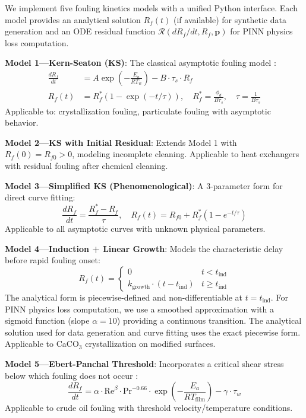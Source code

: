\documentclass[review]{elsarticle}
\begin{document}
We implement five fouling kinetics models with a unified Python interface. Each model provides an analytical solution $R_f(t)$ (if available) for synthetic data generation and an ODE residual function $\mathcal{R}(dR_f/dt, R_f, \mathbf{p})$ for PINN physics loss computation.

\textbf{Model 1---Kern-Seaton (KS)}: The classical asymptotic fouling model \cite{kern1959theoretical}:
\begin{align}
\frac{dR_f}{dt} &= A \exp\left(-\frac{E_a}{RT_w}\right) - B \cdot \tau_s \cdot R_f \\
R_f(t) &= R_f^*\left(1 - \exp(-t/\tau)\right), \quad R_f^* = \frac{\phi_d}{B\tau_s}, \quad \tau = \frac{1}{B\tau_s} \nonumber
\end{align}
Applicable to: crystallization fouling, particulate fouling with asymptotic behavior.

\textbf{Model 2---KS with Initial Residual}: Extends Model 1 with $R_f(0) = R_{f0} > 0$, modeling incomplete cleaning. Applicable to heat exchangers with residual fouling after chemical cleaning.

\textbf{Model 3---Simplified KS (Phenomenological)}: A 3-parameter form for direct curve fitting:
\begin{equation}
\frac{dR_f}{dt} = \frac{R_f^* - R_f}{\tau}, \quad R_f(t) = R_{f0} + R_f^*(1 - e^{-t/\tau})
\end{equation}
Applicable to all asymptotic curves with unknown physical parameters.

\textbf{Model 4---Induction + Linear Growth}: Models the characteristic delay before rapid fouling onset:
\begin{equation}
R_f(t) = \begin{cases} 0 & t < t_{\text{ind}} \\ k_{\text{growth}} \cdot (t - t_{\text{ind}}) & t \geq t_{\text{ind}} \end{cases}
\end{equation}
The analytical form is piecewise-defined and non-differentiable at $t = t_{\text{ind}}$. For PINN physics loss computation, we use a smoothed approximation with a sigmoid function (slope $\alpha = 10$) providing a continuous transition. The analytical solution used for data generation and curve fitting uses the exact piecewise form. Applicable to CaCO$_3$ crystallization on modified surfaces.

\textbf{Model 5---Ebert-Panchal Threshold}: Incorporates a critical shear stress below which fouling does not occur \cite{ebert1997analysis}:
\begin{equation}
\frac{dR_f}{dt} = \alpha \cdot \text{Re}^\beta \cdot \text{Pr}^{-0.66} \cdot \exp\left(-\frac{E_a}{RT_{\text{film}}}\right) - \gamma \cdot \tau_w
\end{equation}
Applicable to crude oil fouling with threshold velocity/temperature conditions.
\end{document}
